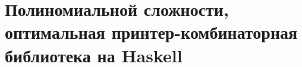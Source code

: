 \appendix

\section{Полиномиальной сложности, оптимальная принтер-комбинаторная библиотека на Haskell}
\label{app:1}


